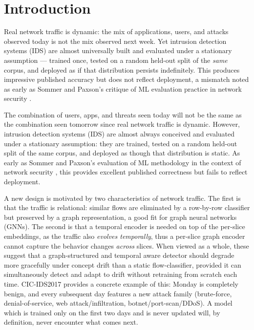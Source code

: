 \documentclass[twocolumn]{llncs}
\begin{document}
\section{Introduction}

Real network traffic is dynamic: the mix of applications, users, and attacks observed today is not
the mix observed next week. Yet intrusion detection systems (IDS) are almost universally built and
evaluated under a stationary assumption --- trained once, tested on a random held-out split of the
\emph{same} corpus, and deployed as if that distribution persists indefinitely. This produces
impressive published accuracy but does not reflect deployment, a mismatch noted as early as Sommer
and Paxson's critique of ML evaluation practice in network security \cite{sommer2010closedworld}.

{\color{blue}The combination of users, apps, and threats seen today will not be the same as the combination seen tomorrow since real network traffic is dynamic. However, intrusion detection systems (IDS) are almost always conceived and evaluated under a stationary assumption: they are trained, tested on a random held-out split of the same corpus, and deployed as though that distribution is static. As early as Sommer and Paxson's evaluation of ML methodology in the context of network security \cite{sommer2010closedworld}, this provides excellent published correctness but fails to reflect deployment. 

A new design is motivated by two characteristics of network traffic. The first is that the traffic is relational: similar flows are eliminated by a row-by-row classifier but preserved by a graph representation, a good fit for graph neural networks (GNNs). The second is that a temporal encoder is needed on top of the per-slice embeddings, as the traffic also \emph{evolves temporally}, thus a per-slice graph encoder cannot capture the behavior changes \emph{across} slices. When viewed as a whole, these suggest that a graph-structured and temporal aware detector should degrade more gracefully under concept drift than a static flow-classifier, provided it can simultaneously detect and adapt to drift without retraining from scratch each time. CIC-IDS2017 provides a concrete example of this: Monday is completely benign, and every subsequent day features a new attack family (brute-force, denial-of-service, web attack/infiltration, botnet/port-scan/DDoS). A model which is trained only on the first two days and is never updated will, by definition, never encounter what comes next.}
\end{document}
